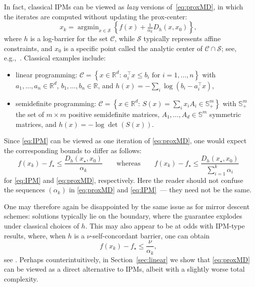 \documentclass[a4paper]{article}
\renewcommand{\leq}{\leqslant}
\newcommand{\CC}{\mathcal{C}}
\renewcommand{\SS}{\mathcal{S}}
\newcommand{\R}{\mathbb{R}}
\DeclareMathOperator*{\argmin}{argmin}
\begin{document}
In fact, classical IPMs can be viewed as \emph{lazy} versions of~\eqref{eq:proxMD}, in which the iterates are computed without updating the prox-center:
\begin{equation}\label{eq:IPM}\tag{IPM}
x_{k} = \argmin_{x\in\SS}\left\{ f(x) + \tfrac{1}{\alpha_k} D_{h}(x,x_0)\right\},
\end{equation}
where $h$ is a log-barrier for the set $\CC$, while $\SS$ typically represents affine constraints, and $x_0$ is a specific point called the analytic center of $\CC\cap\SS$; see, e.g.,~\cite[Definition 5.3.3]{nesterov2018lectures}.
Classical examples include:
\begin{itemize}
        \item linear programming: $\CC=\left\{x\in\R^d:\, a_i^\top\! x\leq b_i \text{ for }i=1,\ldots,n\right\}$ with $a_1,\ldots,a_n\in\R^d$, $b_1,\ldots,b_n\in\R$, and $h(x)=-\sum_{i} \log(b_i-a_i^\top\!x)$,
        \item semidefinite programming: $\CC=\left\{x\in\R^d:\, S(x)=\sum_ix_iA_i\in\mathbb{S}_+^m\right\}$ with $\mathbb{S}_+^m$ the set of $m\times m$ positive semidefinite matrices, $A_1,\ldots,A_d\in\mathbb{S}^m$ symmetric matrices, and $h(x)=-\log\det(S(x))$.
\end{itemize}
Since \eqref{eq:IPM} can be viewed as one iteration of \eqref{eq:proxMD}, one would expect the corresponding bounds to differ as follows:
\[
f(x_k)-f_\star\leq \frac{D_h(x_\star,x_0)}{\alpha_k}
\qquad\text{whereas}\qquad
f(x_k)-f_\star\leq \frac{D_h(x_\star,x_0)}{\sum_{i=1}^{k}\alpha_i}
\]
for \eqref{eq:IPM} and \eqref{eq:proxMD}, respectively.
Here the reader should not confuse the sequences $(\alpha_k)$ in \eqref{eq:proxMD} and \eqref{eq:IPM}~--- they need not be the same.

One may therefore again be disappointed by the same issue as for mirror descent schemes: solutions typically lie on the boundary, where the guarantee explodes under classical choices of $h$.
This may also appear to be at odds with IPM-type results, where, when $h$ is a $\nu$-self-concordant barrier, one can obtain
\[
f(x_k)-f_\star\leq \frac{\nu}{\alpha_k},
\]
see \cite[Theorem 5.3.10]{nesterov2018lectures}.
Perhaps counterintuitively, in Section~\ref{sec:linear} we show that \eqref{eq:proxMD} can be viewed as a direct alternative to IPMs, albeit with a slightly worse total complexity.
\end{document}
